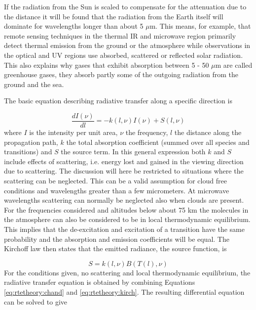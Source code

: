  If the radiation from the Sun is scaled to compensate for the
 attenuation due to the distance it will be found that the radiation
 from the Earth itself will dominate for wavelengths longer than about
 5 $\mu$m. This means, for example, that remote sensing techniques in
 the thermal IR and microwave region primarily detect thermal emission
 from the ground or the atmosphere while observations in the optical
 and UV regions use absorbed, scattered or reflected solar radiation.
 This also explains why gases that exhibit absorption between 5 - 50
 $\mu$m are called greenhouse gases, they absorb partly some of the
 outgoing radiation from the ground and the sea.


 \label{sec:rtetheory:gen_theory}

 The basic equation describing radiative transfer along a specific 
 direction is

 \begin{equation}
   \frac{dI(\nu)}{dl} = -k(l,\nu)I(\nu) + S(l,\nu)
  \label{eq:rtetheory:chand}
 \end{equation} 
 where $I$ is the intensity per unit area, $\nu$ the frequency, $l$
 the distance along the propagation path, $k$ the total absorption
 coefficient (summed over all species and transitions) and $S$ the
 source term. In this general expression both $k$ and $S$ include
 effects of scattering, i.e. energy lost and gained in the viewing
 direction due to scattering. The discussion will here be restricted
 to situations where the scattering can be neglected. This can be a
 valid assumption for cloud free conditions and wavelengths greater
 than a few micrometers. At microwave wavelengths scattering can
 normally be neglected also when clouds are present. For the
 frequencies considered and altitudes below about 75 km the molecules
 in the atmosphere can also be considered to be in local thermodynamic
 equilibrium. This implies that the de-excitation and excitation of a
 transition have the same probability and the absorption and emission
 coefficients will be equal.  The Kirchoff law then states that the
 emitted radiance, the source function, is

 \begin{equation}
   S = k(l,\nu)B(T(l),\nu)
  \label{eq:rtetheory:kirch}
 \end{equation}  
 For the conditions given, no scattering and local thermodynamic
 equilibrium, the radiative transfer equation is obtained by combining
 Equations \ref{eq:rtetheory:chand} and \ref{eq:rtetheory:kirch}. The resulting
 differential equation can be solved to give

